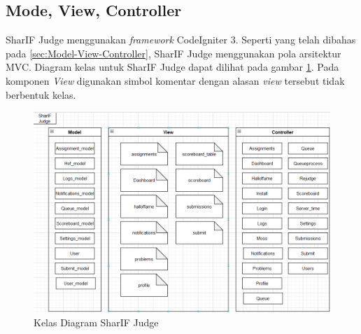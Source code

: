  \subsection{Mode, View, Controller}
SharIF Judge menggunakan \textit{framework} CodeIgniter 3. Seperti yang telah dibahas pada \ref{sec:Model-View-Controller}, SharIF Judge menggunakan pola arsitektur MVC. Diagram kelas untuk SharIF Judge dapat dilihat pada gambar \ref{fig:kelas diagram}. Pada komponen \textit{View} digunakan simbol komentar dengan alasan \textit{view} tersebut tidak berbentuk kelas.
  \begin{figure}[h!]
     \centering
     \includegraphics[width=0.9\linewidth]{Gambar/Kelas Diagram.PNG}
     \caption{Kelas Diagram SharIF Judge}
     \label{fig:kelas diagram}
 \end{figure}
 

